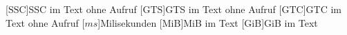 \begin{acronym}[WYSISWG]
    \vspace{1.2cm}








    [\ensuremath{\text{SSC}}]{SSC im Text ohne Aufruf}
    [\ensuremath{\text{GTS}}]{GTS im Text ohne Aufruf}
    [\ensuremath{\text{GTC}}]{GTC im Text ohne Aufruf}
    [\ensuremath{ms}]{Milisekunden}
    [MiB]{MiB im Text}
    [GiB]{GiB im Text}
\end{acronym}

